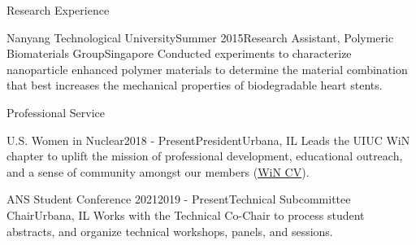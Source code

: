 \documentclass{resume2} %
\begin{document}
\begin{rSection}{Research Experience}
\begin{rSubsection}{Nanyang Technological University}{Summer 2015}{Research Assistant, Polymeric Biomaterials Group}{Singapore}
Conducted experiments to characterize nanoparticle enhanced polymer materials to determine the material 
combination that best increases the mechanical properties of biodegradable heart stents.  
\end{rSubsection}

\end{rSection}

\begin{rSection}{Professional Service}

	\begin{rSubsection}{U.S. Women in Nuclear}{2018 - Present}{President}{Urbana, IL}
	Leads the UIUC WiN chapter to uplift the mission of professional development, 
	educational outreach, and a sense of community amongst our members 
	(\href{https://github.com/gwenchee/wincv}{WiN CV}).
	\end{rSubsection}
	\pagebreak
	\begin{rSubsection}{ANS Student Conference 2021}{2019 - Present}{Technical Subcommittee Chair}{Urbana, IL}
	Works with the Technical Co-Chair to process student abstracts, and organize technical workshops, panels, 
	and sessions. 
	\end{rSubsection}

	\end{rSection}
\end{document}
